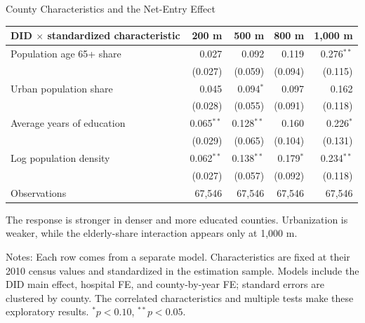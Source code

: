 \documentclass[aspectratio=169,11pt]{beamer}
\begin{document}
\begin{frame}{County Characteristics and the Net-Entry Effect}
\centering
\scriptsize
\setlength{\tabcolsep}{6.5pt}
\begin{tabular}{lrrrr}
\toprule
DID $\times$ standardized characteristic & 200 m & 500 m & 800 m & 1,000 m \\
\midrule
Population age 65+ share
& 0.027 & 0.092 & 0.119 & 0.276$^{**}$ \\
& (0.027) & (0.059) & (0.094) & (0.115) \\
Urban population share
& 0.045 & 0.094$^{*}$ & 0.097 & 0.162 \\
& (0.028) & (0.055) & (0.091) & (0.118) \\
Average years of education
& 0.065$^{**}$ & 0.128$^{**}$ & 0.160 & 0.226$^{*}$ \\
& (0.029) & (0.065) & (0.104) & (0.131) \\
Log population density
& 0.062$^{**}$ & 0.138$^{**}$ & 0.179$^{*}$ & 0.234$^{**}$ \\
& (0.027) & (0.057) & (0.092) & (0.118) \\
\midrule
Observations & 67,546 & 67,546 & 67,546 & 67,546 \\
\bottomrule
\end{tabular}

\vspace{0.55em}
\footnotesize The response is stronger in denser and more educated counties. Urbanization is weaker, while the elderly-share interaction appears only at 1,000 m.
\par\vspace{0.25em}
\raggedright\tiny Notes: Each row comes from a separate model. Characteristics are fixed at their 2010 census values and standardized in the estimation sample. Models include the DID main effect, hospital FE, and county-by-year FE; standard errors are clustered by county. The correlated characteristics and multiple tests make these exploratory results. $^{*}p<0.10$, $^{**}p<0.05$.
\end{frame}
\end{document}
